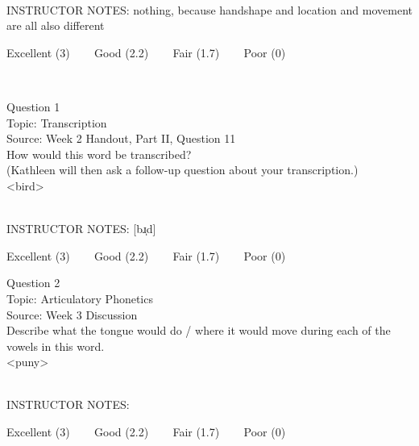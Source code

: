 \documentclass[12pt]{article}
\begin{document}
~\\
INSTRUCTOR NOTES: nothing, because handshape and location and movement are all also different


\vfill
Excellent (3) ~~~ Good (2.2) ~~~ Fair (1.7) ~~~ Poor (0)
\newpage

\begin{center}
\textbf{{\color{red}{\HUGE END OF EXAM}}}\\

\end{center}
\newpage

\begin{center}
\textbf{{\color{blue}{\HUGE START OF EXAM\\}}}

\textbf{{\color{blue}{\HUGE Student ID: 37070\\}}}

\textbf{{\color{blue}{\HUGE \\}}}

\end{center}
\newpage

{\large Question 1}\\

Topic: Transcription\\
Source: Week 2 Handout, Part II, Question 11\\

How would this word be transcribed?\\ (Kathleen will then ask a follow-up question about your transcription.)\\

<bird>


~\\
INSTRUCTOR NOTES: [bɹ̩d]


\vfill
Excellent (3) ~~~ Good (2.2) ~~~ Fair (1.7) ~~~ Poor (0)
\newpage

{\large Question 2}\\

Topic: Articulatory Phonetics\\
Source: Week 3 Discussion\\

Describe what the tongue would do / where it would move during each of the vowels in this word.\\

<puny>


~\\
INSTRUCTOR NOTES: 


\vfill
Excellent (3) ~~~ Good (2.2) ~~~ Fair (1.7) ~~~ Poor (0)
\newpage
\end{document}
